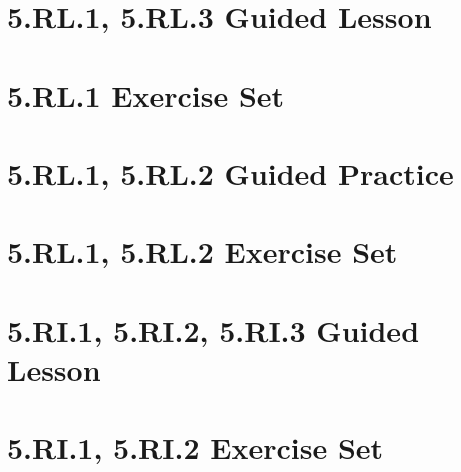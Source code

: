\documentclass[a4paper,12pt]{article}
\title{}
\date{}
\begin{document}
 

\hypertarget{toc}{}  %
\tableofcontents
\newpage

\pagestyle{fancy}  %

\newpage
\section{5.RL.1, 5.RL.3 Guided Lesson}


\newpage
\section{5.RL.1 Exercise Set}



% 

\newpage

\section{5.RL.1, 5.RL.2 Guided Practice}


\newpage
\section{5.RL.1, 5.RL.2 Exercise Set}



\newpage
\section{5.RI.1, 5.RI.2, 5.RI.3 Guided Lesson}




\newpage
\section{5.RI.1, 5.RI.2 Exercise Set}


%
\end{document}
